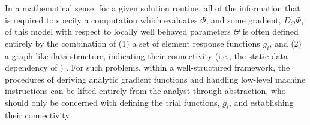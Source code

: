 In a mathematical sense, for a given solution routine, all of the
information that is required to specify a computation which evaluates
\(\Phi\), and some gradient, \(D_\Theta \Phi\), of this model with
respect to locally well behaved parameters \(\Theta\) is often defined
entirely by the combination of (1) a set of element response functions
\(g_i\), and (2) a graph-like data structure, indicating their
connectivity (i.e., the static data dependency of
\textcite{frostig2018compiling}) . For such problems, within a
well-structured framework, the procedures of deriving analytic gradient
functions and handling low-level machine instructions can be lifted
entirely from the analyst through abstraction, who should only be
concerned with defining the trial functions, \(g_i\), and establishing
their connectivity.
